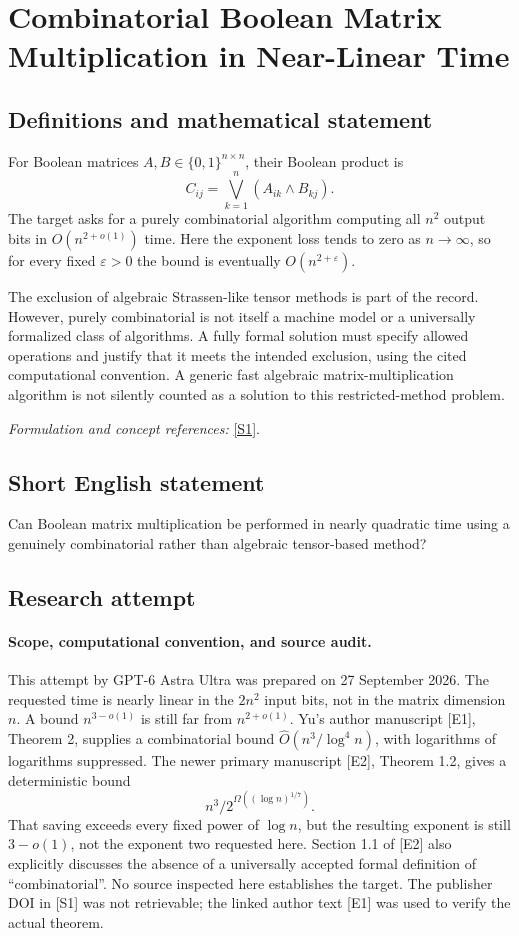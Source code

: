 \documentclass[11pt]{article}
\begin{document}
\section*{\texorpdfstring{Combinatorial Boolean Matrix Multiplication in Near-Linear Time}{Combinatorial Boolean Matrix Multiplication in Near-Linear Time}}\label{30006960}
\subsection{Definitions and mathematical statement}
For Boolean matrices $A,B\in\{0,1\}^{n\times n}$, their Boolean product is
\[
 C_{ij}=\bigvee_{k=1}^n(A_{ik}\wedge B_{kj}).
\]
The target asks for a purely combinatorial algorithm computing all $n^2$ output bits in $O(n^{2+o(1)})$ time. Here the exponent loss tends to zero as $n\to\infty$, so for every fixed ${\varepsilon}>0$ the bound is eventually $O(n^{2+{\varepsilon}})$.

The exclusion of algebraic Strassen-like tensor methods is part of the record. However, purely combinatorial is not itself a machine model or a universally formalized class of algorithms. A fully formal solution must specify allowed operations and justify that it meets the intended exclusion, using the cited computational convention. A generic fast algebraic matrix-multiplication algorithm is not silently counted as a solution to this restricted-method problem.
\par\smallskip\textit{Formulation and concept references:} \href{https://doi.org/10.1109/FOCS.2015.19}{[S1]}.

\subsection{Short English statement}
Can Boolean matrix multiplication be performed in nearly quadratic time using a genuinely combinatorial rather than algebraic tensor-based method?
\subsection{Research attempt}
\paragraph{Scope, computational convention, and source audit.}
This attempt by GPT-6 Astra Ultra was prepared on 27 September 2026.
The requested time is nearly linear in the $2n^2$ input bits, not in the
matrix dimension $n$. A bound $n^{3-o(1)}$ is still far from
$n^{2+o(1)}$. Yu's author manuscript [E1], Theorem 2, supplies a
combinatorial bound $\widehat O(n^3/\log^4 n)$, with logarithms of
logarithms suppressed. The newer primary manuscript [E2], Theorem 1.2,
gives a deterministic bound
\[
                       n^3/2^{\Omega((\log n)^{1/7})}.
\]
That saving exceeds every fixed power of $\log n$, but the resulting
exponent is still $3-o(1)$, not the exponent two requested here.
Section 1.1 of [E2] also explicitly discusses the absence of a universally
accepted formal definition of ``combinatorial''. No source inspected here
establishes the target. The publisher DOI in [S1] was not retrievable;
the linked author text [E1] was used to verify the actual theorem.
\end{document}
